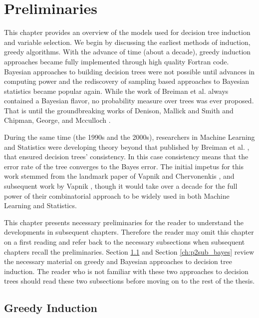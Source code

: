 \section{Preliminaries}
\label{ch:preliminaries}
This chapter provides an overview of the models used for decision tree induction and variable selection. We begin by discussing the earliest methods of induction, greedy algorithms. With the advance of time (about a decade), greedy induction approaches became fully implemented through high quality Fortran code. Bayesian approaches to building decision trees were not possible until advances in computing power and the rediscovery of sampling based approaches to Bayesian statistics became popular again. While the work of Breiman et al. \cite{breiman1984classification} always contained a Bayesian flavor, no probability measure over trees was ever proposed. That is until the groundbreaking works of Denison, Mallick and Smith \cite{denison1998bayesian} and Chipman, George, and Mcculloch \cite{chipman1998bayesian}.

 During the same time (the 1990s and the 2000s), researchers in Machine Learning and Statistics were developing theory beyond that published by Breiman et al. \cite{breiman1984classification}, that ensured decision trees' consistency. In this case consistency means that the error rate of the tree converges to the Bayes error. The initial impetus for this work stemmed from the landmark paper of Vapnik and Chervonenkis \cite{vapnik1971uniform}, and subsequent work by Vapnik \cite{vapnik2000nature}, though it would take over a decade for the full power of their combinatorial approach to be widely used in both Machine Learning and Statistics. 

This chapter presents necessary preliminaries for the reader to understand the developments in subsequent chapters. Therefore the reader may omit this chapter on a first reading and refer back to the necessary subsections when subsequent chapters recall the preliminaries. Section \ref{ch:p1sub_greedy_ind} and Section \ref{ch:p2sub_bayes} review the necessary material on greedy and Bayesian approaches to decision tree induction. The reader who is not familiar with these two approaches to decision trees should read these two subsections before moving on to the rest of the thesis.  

\subsection{Greedy Induction}
\label{ch:p1sub_greedy_ind}

